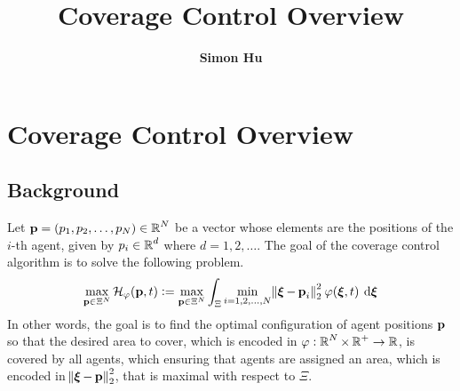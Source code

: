 \documentclass{article}
\title{\bf\Large Coverage Control Overview}
\author{\bf Simon Hu}
\date{}
\DeclareMathOperator{\bxi}{\boldsymbol{\xi}}
\begin{document}
\maketitle 
\glsaddall
\printglossary[style=mystyle, type=symbolslist]
\newpage

\section{Coverage Control Overview}
\subsection{Background}
Let $\operatorname{\mathbf{p}} = (p_1, p_2, \dots, p_N) \in \operatorname{\mathbb{R}}^N$ be a vector whose elements are the positions of the $i$-th agent, given by $p_i \in \operatorname{\mathbb{R}}^d$ where $d=1, 2, \dots$. The goal of the coverage control algorithm is to solve the following problem.
\begin{equation}
	\label{eq:problem statement}
	\displaystyle \max\limits_{\bp \in \Xi^N}{\mathcal{H}_{\varphi}(\bp, t)} := \max\limits_{\bp \in \Xi^N}{\int_{\Xi}{\min\limits_{i=1, 2, \dots, N}{\norm{\bxi - \bp_i}^2_2} \: \varphi(\bxi, t) \: \dif \bxi}}
\end{equation}
In other words, the goal is to find the optimal configuration of agent positions $\operatorname{\mathbf{p}}$ so that the desired area to cover, which is encoded in $\varphi : \operatorname{\mathbb{R}}^N \times \operatorname{\mathbb{R}}^+ \to \operatorname{\mathbb{R}}$, is covered by all agents, which ensuring that agents are assigned an area, which is encoded in $\norm{\bxi - \bp}_2^2$, that is maximal with respect to $\Xi$. 
\end{document}
